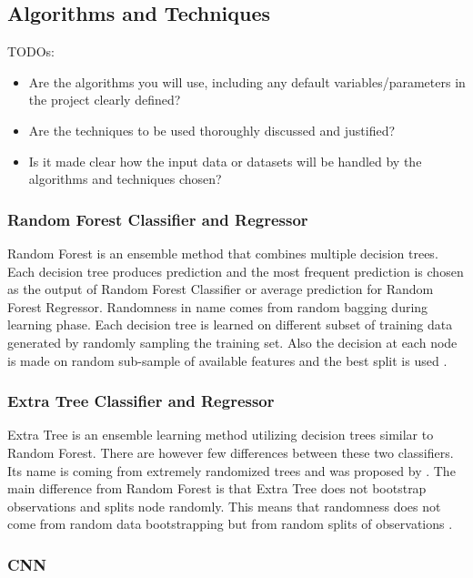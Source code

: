 \documentclass{article}
\begin{document}
\subsection{Algorithms and Techniques}
\color{red}
TODOs:
\begin{itemize}
    \item Are the algorithms you will use, including any default variables/parameters in the project clearly defined?
    \item Are the techniques to be used thoroughly discussed and justified?
    \item Is it made clear how the input data or datasets will be handled by the algorithms and techniques chosen?
\end{itemize}
\color{black}

\subsubsection{Random Forest Classifier and Regressor}
Random Forest is an ensemble method that combines multiple decision trees. Each decision tree produces prediction and the most frequent prediction is chosen as the output of Random Forest Classifier or average prediction for Random Forest Regressor. Randomness in name comes from random bagging during learning phase. Each decision tree is learned on different subset of training data generated by randomly sampling the training set. Also the decision at each node is made on random sub-sample of available features and the best split is used \citep{yiu2019randomforest} \citep{wiki2019randomforest}.


\subsubsection{Extra Tree Classifier and Regressor}
Extra Tree is an ensemble learning method utilizing decision trees similar to Random Forest. There are however few differences between these two classifiers. Its name is coming from extremely randomized trees and was proposed by \citep{geurts206extratree}. The main difference from Random Forest is that Extra Tree does not bootstrap observations and splits node randomly. This means that randomness does not come from random data bootstrapping but from random splits of observations \citep{bhandari2019extratree}.

\subsubsection{CNN}
\end{document}
